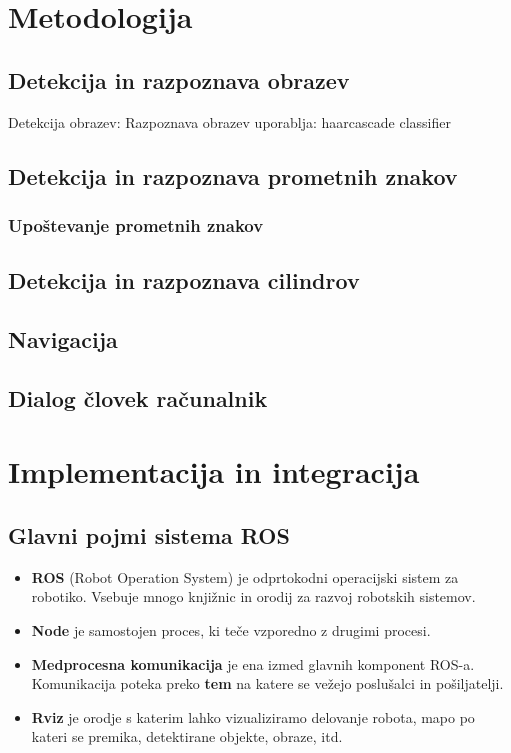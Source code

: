 \documentclass[a4paper,11pt]{article}
\begin{document}

\section{Metodologija}
\subsection{Detekcija in razpoznava obrazev}

Detekcija obrazev: 
Razpoznava obrazev uporablja: haarcascade classifier

\subsection{Detekcija in razpoznava prometnih znakov}
\subsubsection{Upoštevanje prometnih znakov}
\subsection{Detekcija in razpoznava cilindrov}
\subsection{Navigacija}
\subsection{Dialog človek računalnik}


\section{Implementacija in integracija}

\subsection{Glavni pojmi sistema ROS}

\begin{itemize}
\item \textbf{ROS} (Robot Operation System) je odprtokodni operacijski sistem za robotiko. Vsebuje mnogo knjižnic in orodij za razvoj robotskih sistemov.
\item \textbf{Node} je samostojen proces, ki teče vzporedno z drugimi procesi.
\item \textbf{Medprocesna komunikacija} je ena izmed glavnih komponent ROS-a. Komunikacija poteka preko \textbf{tem} na katere se vežejo poslušalci in pošiljatelji. 
\item \textbf{Rviz} je orodje s katerim lahko vizualiziramo delovanje robota, mapo po kateri se premika, detektirane objekte, obraze, itd.
\end{itemize}
\end{document}
